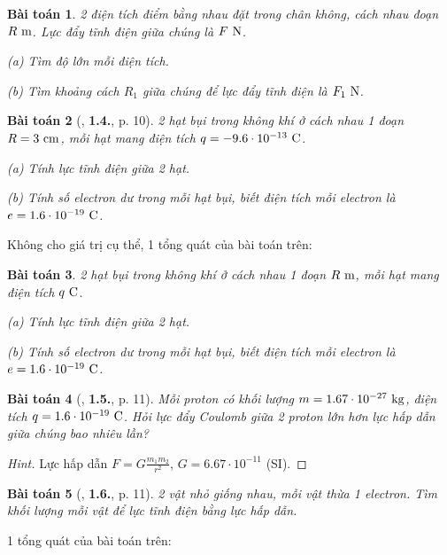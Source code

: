 \documentclass{article}
\numberwithin{equation}{section}
\newtheorem{baitoan}{Bài toán}[section]
\begin{document}
\begin{baitoan}
	2 điện tích điểm bằng nhau đặt trong chân không, cách nhau đoạn $R\ {\rm m}$. Lực đẩy tĩnh điện giữa chúng là $F\ {\rm N}$.
	\begin{enumerate*}
		\item[(a)] Tìm độ lớn mỗi điện tích.
		\item[(b)] Tìm khoảng cách $R_1$ giữa chúng để lực đẩy tĩnh điện là $F_1\ {\rm N}$.
	\end{enumerate*}
\end{baitoan}

\begin{baitoan}[\cite{Giai_Toan_Vat_Ly_11_tap_1}, \textbf{1.4.}, p. 10]
	2 hạt bụi trong không khí ở cách nhau 1 đoạn $R = 3\ {\rm cm}$, mỗi hạt mang điện tích $q = -9.6\cdot 10^{-13}\ {\rm C}$.
	\begin{enumerate*}
		\item[(a)] Tính lực tĩnh điện giữa 2 hạt.
		\item[(b)] Tính số electron dư trong mỗi hạt bụi, biết điện tích mỗi electron là $e = 1.6\cdot 10^{-19}\ {\rm C}$.
	\end{enumerate*}
\end{baitoan}
Không cho giá trị cụ thể, 1 tổng quát của bài toán trên:

\begin{baitoan}
	2 hạt bụi trong không khí ở cách nhau 1 đoạn $R\ {\rm m}$, mỗi hạt mang điện tích $q\ {\rm C}$.
	\begin{enumerate*}
		\item[(a)] Tính lực tĩnh điện giữa 2 hạt.
		\item[(b)] Tính số electron dư trong mỗi hạt bụi, biết điện tích mỗi electron là $e = 1.6\cdot 10^{-19}\ {\rm C}$.
	\end{enumerate*}
\end{baitoan}

\begin{baitoan}[\cite{Giai_Toan_Vat_Ly_11_tap_1}, \textbf{1.5.}, p. 11]
	Mỗi proton có khối lượng $m = 1.67\cdot 10^{-27}\ {\rm kg}$, điện tích $q = 1.6\cdot 10^{-19}\ {\rm C}$. Hỏi lực đẩy Coulomb giữa 2 proton lớn hơn lực hấp dẫn giữa chúng bao nhiêu lần?
\end{baitoan}

\begin{proof}[Hint]
	Lực hấp dẫn $F = G\frac{m_1m_2}{r^2}$, $G = 6.67\cdot 10^{-11}$ (SI).
\end{proof}

\begin{baitoan}[\cite{Giai_Toan_Vat_Ly_11_tap_1}, \textbf{1.6.}, p. 11]
	2 vật nhỏ giống nhau, mỗi vật thừa 1 electron. Tìm khối lượng mỗi vật để lực tĩnh điện bằng lực hấp dẫn.
\end{baitoan}
1 tổng quát của bài toán trên:
\end{document}
